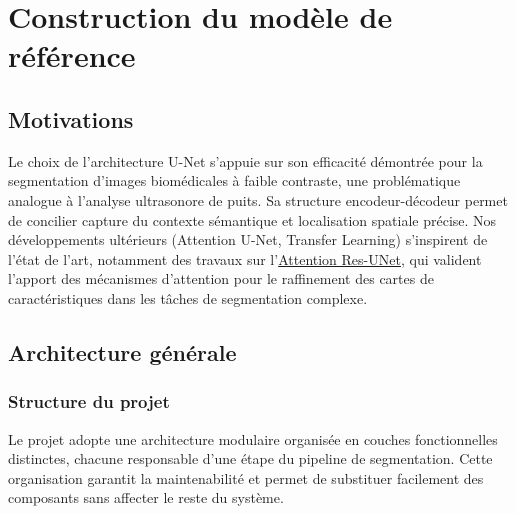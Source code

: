 \section{Construction du modèle de référence}

\subsection{Motivations}
Le choix de l'architecture U-Net s'appuie sur son efficacité démontrée pour la segmentation d'images biomédicales à faible contraste, une problématique analogue à l'analyse ultrasonore de puits. Sa structure encodeur-décodeur permet de concilier capture du contexte sémantique et localisation spatiale précise.
Nos développements ultérieurs (Attention U-Net, Transfer Learning) s'inspirent de l'état de l'art, notamment des travaux sur l'\href{https://www.sciencedirect.com/science/article/pii/S1746809421006741}{Attention Res-UNet}, qui valident l'apport des mécanismes d'attention pour le raffinement des cartes de caractéristiques dans les tâches de segmentation complexe.


\subsection{Architecture générale}

\subsubsection{Structure du projet}

Le projet adopte une architecture modulaire organisée en couches fonctionnelles
distinctes, chacune responsable d'une étape du pipeline de segmentation.
Cette organisation garantit la maintenabilité et permet de substituer
facilement des composants sans affecter le reste du système.

